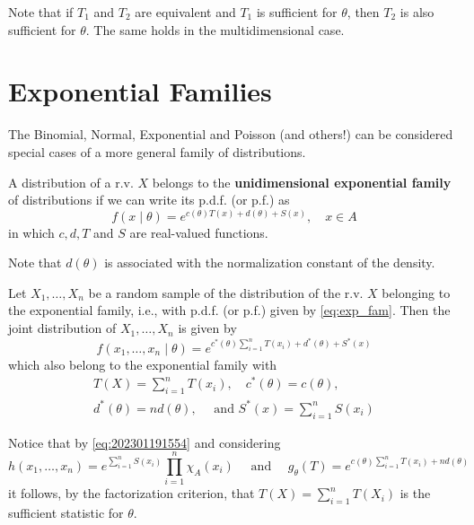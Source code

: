 \documentclass[12pt,a4paper]{report}
\begin{document}
Note that if $T_1$ and $T_2$ are equivalent and $T_1$ is sufficient for $\theta$, then $T_2$ is also sufficient for $\theta$. The same holds in the multidimensional case.

\section{Exponential Families}

The Binomial, Normal, Exponential and Poisson (and others!) can be considered special cases of a more general family of distributions.

\begin{definition}
    A distribution of a r.v. $X$ belongs to the \textbf{unidimensional exponential family} of distributions if we can write its p.d.f. (or p.f.) as 
    \begin{equation}\label{eq:exp_fam}
        f(x \mid \theta) = e^{c(\theta) T(x) + d(\theta) + S(x)}, \quad x \in A
    \end{equation}
    in which $c, d, T$ and $S$ are real-valued functions. 
\end{definition}

Note that $d(\theta)$ is associated with the normalization constant of the density. 

\begin{theorem}\label{thm:202301201053}
    Let $X_1, \ldots, X_n$ be a random sample of the distribution of the r.v. $X$ belonging to the exponential family, i.e., with p.d.f. (or p.f.) given by \eqref{eq:exp_fam}. Then the joint distribution of $X_1, \ldots, X_n$ is given by 
    \begin{equation}\label{eq:202301191554}
        f(x_1, \ldots, x_n \mid \theta) = e^{c^\ast(\theta) \sum_{i=1}^n T(x_i) + d^\ast(\theta) + S^\ast(x)}
    \end{equation}
    which also belong to the exponential family with 
    \begin{equation*}
        \begin{aligned}
            T(X) = \sum_{i=1}^{n} T(x_i), \quad c^\ast(\theta) = c(\theta), 
            \\ d^\ast(\theta) = n d(\theta), \quad \text{ and } S^\ast(x) = \sum_{i=1}^{n} S(x_i)
        \end{aligned}
    \end{equation*}
\end{theorem}

Notice that by \eqref{eq:202301191554} and considering
\[
    h(x_1, \ldots, x_n) = e^{\sum_{i=1}^{n} S(x_i)} \prod_{i=1}^{n} \chi_A(x_i) \quad \text{ and } \quad g_\theta(T) = e^{c(\theta) \sum_{i=1}^{n} T(x_i) + nd(\theta)}
\]
it follows, by the factorization criterion, that $T(X) = \sum_{i=1}^{n} T(X_i)$ is the sufficient statistic for $\theta$. 
\end{document}

